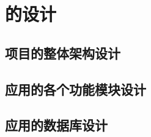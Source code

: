 \chapter{\app 的设计}\label{ch:design}


\section{项目的整体架构设计}\label{sec:arch}



\section{应用的各个功能模块设计}\label{sec:modules}



\section{应用的数据库设计}\label{sec:db}

